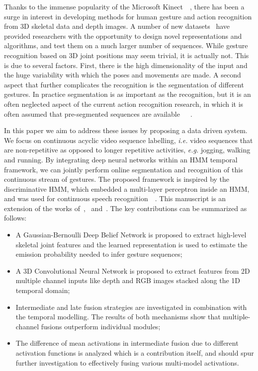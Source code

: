 Thanks to the immense popularity of the Microsoft Kinect~\cite{shotton2011real}~\cite{lingshao2}, there has been a surge in interest in developing methods for human gesture and action recognition from 3D skeletal data and depth images.
A number of new datasets~\cite{ICMI,fothergill2012instructing,guyon2012chalearn,wang2012mining} have provided researchers with the opportunity to design novel representations and algorithms, and test them on a much larger number of sequences.
While gesture recognition based on 3D joint positions may seem trivial, it is actually not. This is due to several factors. First, there is the high dimensionality of the input and the huge variability with which the poses and movements are made.
A second aspect that further complicates the recognition is the segmentation of different gestures. In practice segmentation is as important as the recognition, but it is an often neglected aspect of the current action recognition research, in which it is often assumed that  pre-segmented sequences are available~\cite{laptev2005space}~\cite{marszalek09}~\cite{Kuehne11}.

In this paper we aim to address these issues by proposing a data driven system. We focus on continuous acyclic video sequence labelling, \emph{i.e.} video sequences that are non-repetitive as opposed to longer repetitive activities, \textit{e.g.} jogging, walking and running. By integrating deep neural networks within an HMM temporal framework, we can jointly perform online segmentation and recognition of this continuous stream of gestures. The proposed framework is inspired by the discriminative HMM, which embedded a multi-layer perceptron inside an HMM, and was used for continuous speech recognition~\cite{renals1994connectionist}~\cite{bourlard1994connectionist}.
This manuscript is an extension of the works of~\cite{diwucvpr14},~\cite{wu2014deep} and~\cite{lio2014deep}.
The key contributions can be summarized as follows:
\begin{itemize}
\item A Gaussian-Bernoulli Deep Belief Network is proposed to extract high-level skeletal joint features and the learned representation is used to estimate the emission probability needed to infer gesture sequences;
\item A 3D Convolutional Neural Network  is proposed to extract features from 2D multiple channel inputs like  depth and RGB images stacked along the 1D temporal domain;
\item Intermediate and late fusion strategies are investigated in combination with the temporal modelling. The results of both mechanisms show that multiple-channel fusions outperform individual modules;
\item The difference of mean activations in intermediate fusion due to different activation functions is analyzed which is a contribution itself, and should spur further investigation to effectively fusing various multi-model activations.
\end{itemize}

